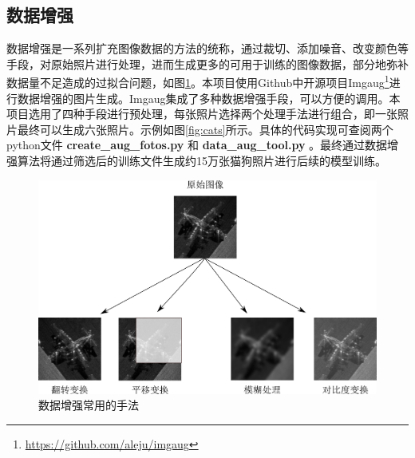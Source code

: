 \documentclass[a4paper,11pt]{article}
\begin{document}
\subsection{数据增强}
\label{sec:org7d9b262}
数据增强是一系列扩充图像数据的方法的统称，通过裁切、添加噪音、改变颜色等手段，对原始照片进行处理，进而生成更多的可用于训练的图像数据，部分地弥补数据量不足造成的过拟合问题，如图\ref{fig:imgaug}。本项目使用Github中开源项目Imgaug\footnote{\url{https://github.com/aleju/imgaug}}进行数据增强的图片生成。Imgaug集成了多种数据增强手段，可以方便的调用。本项目选用了四种手段进行预处理，每张照片选择两个处理手法进行组合，即一张照片最终可以生成六张照片。示例如图\ref{fig:cats}所示。具体的代码实现可查阅两个python文件 \textbf{create\_aug\_fotos.py} 和 \textbf{data\_aug\_tool.py} 。最终通过数据增强算法将通过筛选后的训练文件生成约15万张猫狗照片进行后续的模型训练。

\begin{figure}[htb]
\centering
\includegraphics[scale=0.6]{./figure/tuxiang.png}
\caption{数据增强常用的手法}
\label{fig:imgaug}
\end{figure}
\end{document}
